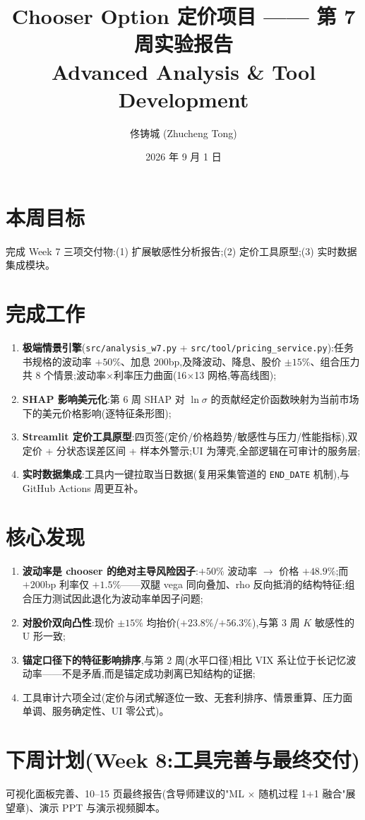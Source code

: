 \documentclass[11pt]{ctexart}
\title{\textbf{Chooser Option 定价项目 —— 第 7 周实验报告}\\
\large Advanced Analysis \& Tool Development}
\author{佟铸城 (Zhucheng Tong)}
\date{2026 年 9 月 1 日}
\begin{document}
\maketitle

\section{本周目标}
完成 Week 7 三项交付物:(1) 扩展敏感性分析报告;(2) 定价工具原型;(3) 实时数据集成模块。

\section{完成工作}
\begin{enumerate}
  \item \textbf{极端情景引擎}(\texttt{src/analysis\_w7.py} + \texttt{src/tool/pricing\_service.py}):任务书规格的波动率 $+50\%$、加息 200bp,及降波动、降息、股价 $\pm15\%$、组合压力共 8 个情景;波动率$\times$利率压力曲面(16$\times$13 网格,等高线图);
  \item \textbf{SHAP 影响美元化}:第 6 周 SHAP 对 $\ln\sigma$ 的贡献经定价函数映射为当前市场下的美元价格影响(逐特征条形图);
  \item \textbf{Streamlit 定价工具原型}:四页签(定价/价格趋势/敏感性与压力/性能指标),双定价 + 分状态误差区间 + 样本外警示;UI 为薄壳,全部逻辑在可审计的服务层;
  \item \textbf{实时数据集成}:工具内一键拉取当日数据(复用采集管道的 \texttt{END\_DATE} 机制),与 GitHub Actions 周更互补。
\end{enumerate}

\section{核心发现}
\begin{enumerate}
  \item \textbf{波动率是 chooser 的绝对主导风险因子}:$+50\%$ 波动率 $\to$ 价格 $+48.9\%$;而 $+200$bp 利率仅 $+1.5\%$——双腿 vega 同向叠加、rho 反向抵消的结构特征;组合压力测试因此退化为波动率单因子问题;
  \item \textbf{对股价双向凸性}:现价 $\pm15\%$ 均抬价($+23.8\%$/$+56.3\%$),与第 3 周 $K$ 敏感性的 U 形一致;
  \item \textbf{锚定口径下的特征影响排序},与第 2 周(水平口径)相比 VIX 系让位于长记忆波动率——不是矛盾,而是锚定成功剥离已知结构的证据;
  \item 工具审计六项全过(定价与闭式解逐位一致、无套利排序、情景重算、压力面单调、服务确定性、UI 零公式)。
\end{enumerate}

\section{下周计划(Week 8:工具完善与最终交付)}
可视化面板完善、10--15 页最终报告(含导师建议的"ML $\times$ 随机过程 1+1 融合"展望章)、演示 PPT 与演示视频脚本。
\end{document}
